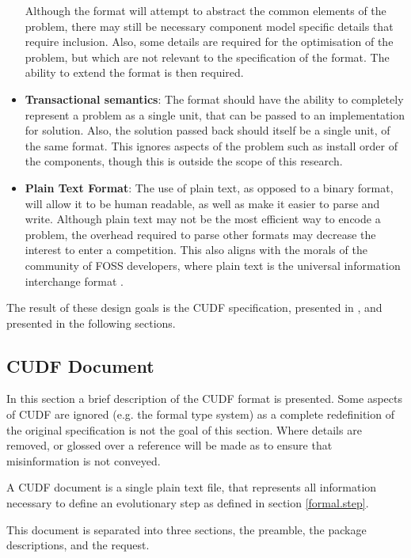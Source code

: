 \begin{itemize}
  Although the format will attempt to abstract the common elements of the problem, there may still be necessary component model specific details that require inclusion.
  Also, some details are required for the optimisation of the problem, but which are not relevant to the specification of the format.
  The ability to extend the format is then required.
  \item \textbf{Transactional semantics}:
  The format should have the ability to completely represent a problem as a single unit, that can be passed to an implementation for solution.
  Also, the solution passed back should itself be a single unit, of the same format.
  This ignores aspects of the problem such as install order of the components, though this is outside the scope of this research.
  \item \textbf{Plain Text Format}:
  The use of plain text, as opposed to a binary format, will allow it to be human readable, as well as make it easier to parse and write.
  Although plain text may not be the most efficient way to encode a problem, the overhead required to parse other formats may decrease the interest to enter a competition.
  This also aligns with the morals of the community of FOSS developers, where plain text is the universal information interchange format \citep{raymond2003art}.
\end{itemize}

The result of these design goals is the CUDF specification, presented in \citep{treinen2009common}, and presented in the following sections.

\subsection{CUDF Document}
In this section a brief description of the CUDF format is presented.
Some aspects of CUDF are ignored (e.g. the formal type system) as a complete redefinition of the original specification is not the goal of this section.
Where details are removed, or glossed over a reference will be made as to ensure that misinformation is not conveyed. 

A CUDF document is a single plain text file, that represents all information necessary to define an evolutionary step as defined in section \ref{formal.step}.

This document is separated into three sections, the preamble, the package descriptions, and the request.

